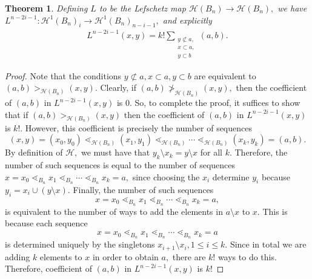 \documentclass[10 pt]{amsart}
\theoremstyle{plain}
\newtheorem{thm}{Theorem}[section]
\theoremstyle{definition}
\theoremstyle{remark}
\numberwithin{equation}{section}
\newcommand\fbn{\mathcal H}
\begin{document}
\begin{thm}
\label{explicit_gbn_lefchetz}
Defining $L$ to be the Lefschetz map $\mathcal H(B_n) \rightarrow \mathcal H(B_n),$ we have $L^{n-2i-1}:\fbn^1(B_n)_i \rightarrow \fbn^1(B_n)_{n-i-1},$ and explicitly 
\begin{align*}
	L^{n-2i-1}(x, y)= k!\sum_{\substack{{y \not \subset a,}\\{x\subset a,}\\{y \subset b}}}^{}(a, b).
\end{align*}
\end{thm}
\begin{proof}
Note that the conditions $y \not \subset a, x\subset a, y\subset b$ are equivalent to $(a, b) >_{ \mathcal H(B_n)} (x, y).$ Clearly, if $(a, b) \not >_{ \mathcal H(B_n)} (x, y),$ then the coefficient of $(a, b)$ in $	L^{n-2i-1}(x, y)$ is 0. So, to complete the proof, it suffices to show that if  $(a, b) >_{ \mathcal H(B_n)} (x, y)$ then the coefficient of $(a, b)$ in $	L^{n-2i-1}(x, y)$ is $k!$. However, this coefficient is precisely the number of sequences 
$$(x, y) = (x_0, y_0) \lessdot_{ \mathcal H(B_n)} (x_1, y_1) \lessdot_{ \mathcal H(B_n)}  \cdots \lessdot_{ \mathcal H(B_n)}  (x_k, y_k) = (a, b).$$
By definition of $ \mathcal H,$ we must have that $y_k \setminus x_k = y\setminus x$ for all $k.$ Therefore, the number of such sequences is equal to the number of sequences $x=x_0 \lessdot_{B_n} x_1 \lessdot_{B_n} \cdots \lessdot_{B_n} x_k = a,$ since choosing the $x_i$ determine $y_i$ because $y_i = x_i \cup (y \setminus x).$ Finally, the number of such sequences  
$$x=x_0 \lessdot_{B_n} x_1 \lessdot_{B_n} \cdots \lessdot_{B_n} x_k = a,$$
is equivalent to the number of ways to add the elements in $a \setminus x$ to $x$. This is because each sequence 
$$x=x_0 \lessdot_{B_n} x_1 \lessdot_{B_n} \cdots \lessdot_{B_n} x_k = a$$
is determined uniquely by the singletons $x_{i+1} \setminus x_i, 1 \leq i \leq k.$ Since in total we are adding $k$ elements to $x$ in order to obtain $a,$ there are $k!$ ways to do this. Therefore, coefficient of $(a, b)$ in $	L^{n-2i-1}(x, y)$ is $k!$
\end{proof}
\end{document}
